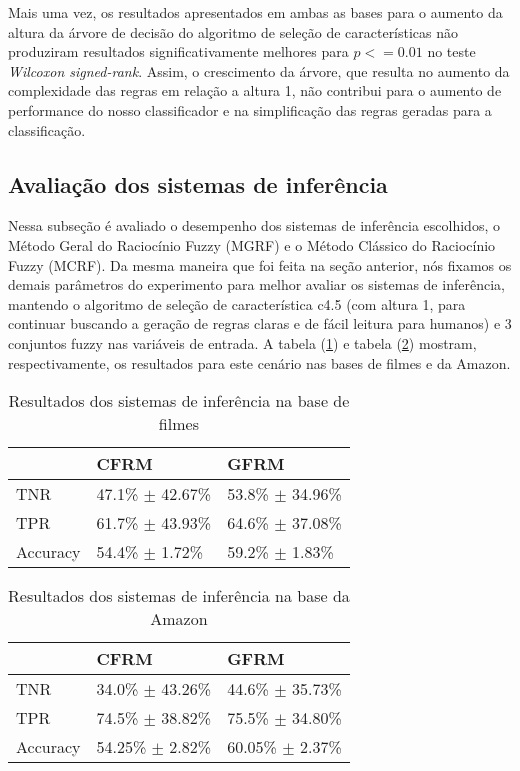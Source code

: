 Mais uma vez, os resultados apresentados em ambas as bases para o aumento da altura da árvore de decisão do algoritmo de seleção de características não produziram resultados significativamente melhores para $p <= 0.01$ no teste \textit{Wilcoxon signed-rank}. Assim, o crescimento da árvore, que resulta no aumento da complexidade das regras em relação a altura 1, não contribui para o aumento de performance do nosso classificador e na simplificação das regras geradas para a classificação. 

\subsection{Avaliação dos sistemas de inferência}

Nessa subseção é avaliado o desempenho dos sistemas de inferência escolhidos, o Método Geral do Raciocínio Fuzzy (MGRF) e o Método Clássico do Raciocínio Fuzzy (MCRF). Da mesma maneira que foi feita na seção anterior, nós fixamos os demais parâmetros do experimento para melhor avaliar os sistemas de inferência, mantendo o algoritmo de seleção de característica c4.5 (com altura 1, para continuar buscando a geração de regras claras e de fácil leitura para humanos) e 3 conjuntos fuzzy nas variáveis de entrada. A tabela (\ref{table:movies2}) e tabela (\ref{table:amazon2}) mostram, respectivamente, os resultados para este cenário nas bases de filmes e da Amazon.

\begin{table}[!h]
    \begin{tabular}{lll}
 	~         			& CFRM 								& GFRM \\ \hline
    TNR 				& 47.1\% $\pm$ 42.67\%   & 53.8\% $\pm$ 34.96\%    \\
    TPR    			& 61.7\% $\pm$ 43.93\%   & 64.6\% $\pm$ 37.08\%   \\
    Accuracy  		& 54.4\% $\pm$ 1.72\%    	& 59.2\% $\pm$ 1.83\%    \\
    \end{tabular}
    \caption{Resultados dos sistemas de inferência na base de filmes}
	\label{table:movies2}
\end{table}

%
%
%

\begin{table}[!h]
    \begin{tabular}{lll}
    ~         			& CFRM 									& GFRM \\ \hline
    TNR 				& 34.0\% $\pm$ 43.26\%    	& 44.6\% $\pm$ 35.73\%    \\
    TPR    			& 74.5\% $\pm$ 38.82\%    	& 75.5\% $\pm$ 34.80\%    \\
    Accuracy  		& 54.25\% $\pm$ 2.82\%    	& 60.05\% $\pm$ 2.37\%   \\
    \end{tabular}
    \caption{Resultados dos sistemas de inferência na base da Amazon}
	\label{table:amazon2}
\end{table}

